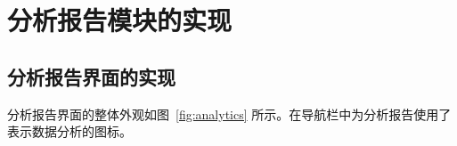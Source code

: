 \section{分析报告模块的实现}\label{sec:analytics}

\subsection{分析报告界面的实现}\label{subsec:analytics-ui}

分析报告界面的整体外观如图~\ref{fig:analytics} 所示。在导航栏中为分析报告使用了表示数据分析的图标。

\begin{figure}[!ht]

\end{figure}
